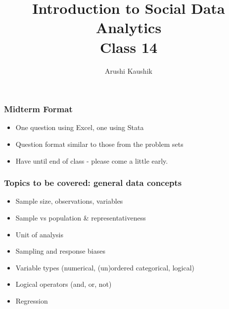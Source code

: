 \documentclass[11pt]{beamer}
\title[Class 14]{Introduction to Social Data Analytics \\
	\bigskip Class 14}
\author[Kaushik]{Arushi Kaushik}
\institute[UCSD]{arkaushi@ucsd.edu}
\begin{document}
\frame{\titlepage}


\begin{frame}
\frametitle{Midterm Format}
\begin{itemize}\itemsep1em
	\item One question using Excel, one using Stata
	\item Question format similar to those from the problem sets
	\item Have until end of class - please come a little early. 
\end{itemize}
\end{frame}

\begin{frame}
\frametitle{Topics to be covered: general data concepts}
\begin{itemize}\itemsep1em
	\item Sample size, observations, variables
	\item Sample vs population \& representativeness
	\item Unit of analysis
	\item Sampling and response biases
	\item Variable types (numerical, (un)ordered categorical, logical)
	\item Logical operators (and, or, not)
	\item Regression
\end{itemize}
\end{frame}
\end{document}

